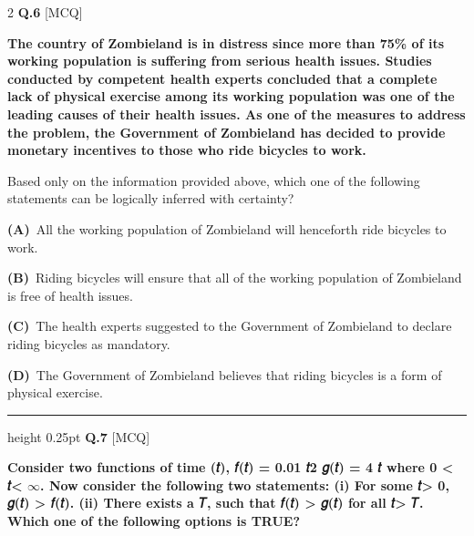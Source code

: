 \documentclass[a4paper,10pt,twoside]{article}
\begin{document}
\begin{multicols}{2}
\noindent\textbf{Q.6} \hfill {\footnotesize\textsf{[MCQ]}}
\par\vspace{2pt}
{\bfseries The country of Zombieland is in distress since more than 75\% of its working
population is suffering from serious health issues. Studies conducted by competent
health experts concluded that a complete lack of physical exercise among its
working population was one of the leading causes of their health issues. As one of
the measures to address the problem, the Government of Zombieland has decided
to provide monetary incentives to those who ride bicycles to work.
\par\smallskip
Based only on the information provided above, which one of the following
statements can be logically inferred with certainty? \par}
\par\vspace{2pt}\noindent
\textbf{(A)}~All the working population of Zombieland will henceforth ride bicycles to work.\par\vspace{2pt}\noindent
\textbf{(B)}~Riding bicycles will ensure that all of the working population of Zombieland is free \newline of health issues.\par\vspace{2pt}\noindent
\textbf{(C)}~The health experts suggested to the Government of Zombieland to declare riding \newline bicycles as mandatory.\par\vspace{2pt}\noindent
\textbf{(D)}~The Government of Zombieland believes that riding bicycles is a form of physical \newline exercise.
\par\vspace{6pt}\hrule height 0.25pt\vspace{6pt}
\noindent\textbf{Q.7} \hfill {\footnotesize\textsf{[MCQ]}}
\par\vspace{2pt}
{\bfseries Consider two functions of time (𝑡),
𝑓(𝑡) = 0.01 𝑡2
𝑔(𝑡) = 4 𝑡
where 0 < 𝑡< $\infty$.
Now consider the following two statements:
(i)
For some 𝑡> 0, 𝑔(𝑡) > 𝑓(𝑡).
(ii)
There exists a 𝑇, such that 𝑓(𝑡) > 𝑔(𝑡) for all 𝑡> 𝑇.
Which one of the following options is TRUE? \par}
\par\vspace{2pt}\noindent

\end{multicols}
\end{document}
